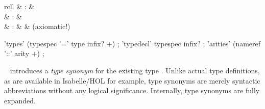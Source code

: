\begin{isabellebody}
\begin{isamarkuptext}
\begin{description}
  \end{description}%
\end{isamarkuptext}%
\isamarkuptrue%
%
\isamarkuptrue%
%
\begin{isamarkuptext}%
\begin{matharray}{rcll}
    \hypertarget{command.types}{\hyperlink{command.types}{\mbox{}}} & : &  \\
    \hypertarget{command.typedecl}{\hyperlink{command.typedecl}{\mbox{}}} & : &  \\
    \hypertarget{command.arities}{\hyperlink{command.arities}{\mbox{}}} & : &  & (axiomatic!) \\
  \end{matharray}

  \begin{rail}
    'types' (typespec '=' type infix? +)
    ;
    'typedecl' typespec infix?
    ;
    'arities' (nameref '::' arity +)
    ;
  \end{rail}

  \begin{description}

  \item \hyperlink{command.types}{\mbox{}}~ introduces a
  \emph{type synonym}  for the existing type
  \isa{{\isachardoublequote}{\isasymtau}{\isachardoublequote}}.  Unlike actual type definitions, as are available in
  Isabelle/HOL for example, type synonyms are merely syntactic
  abbreviations without any logical significance.  Internally, type
  synonyms are fully expanded.
  

\end{description}
\end{isamarkuptext}
\end{isabellebody}
